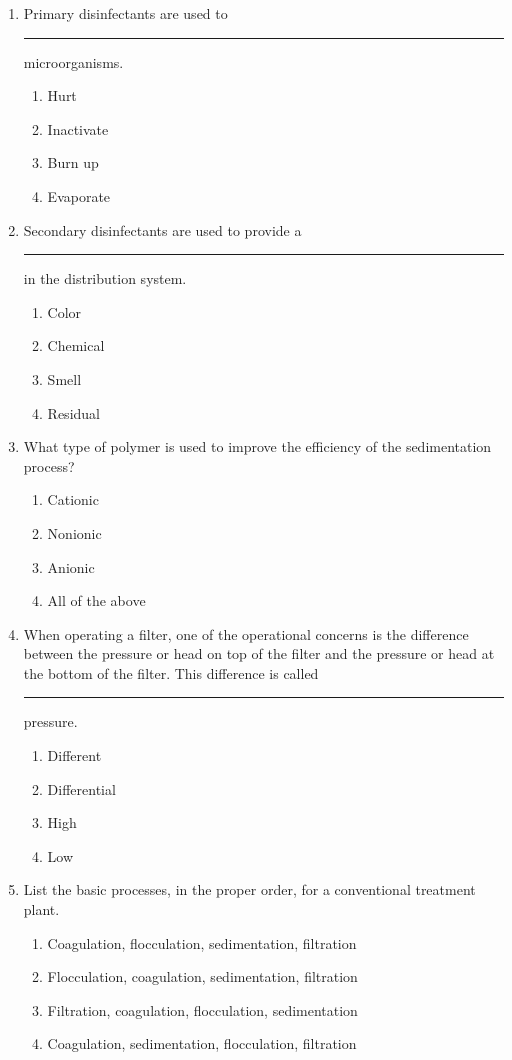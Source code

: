 \begin{enumerate}
\item Primary disinfectants are used to \rule{1cm}{0.5pt}  microorganisms.
\begin{enumerate}
\item Hurt
\item Inactivate
\item Burn up
\item Evaporate
\end{enumerate}

\item Secondary disinfectants are used to provide a \rule{1cm}{0.5pt}  in the distribution system.
\begin{enumerate}
\item Color
\item Chemical
\item Smell
\item Residual
\end{enumerate}

\item What type of polymer is used to improve the efficiency of the sedimentation
process?
\begin{enumerate}
\item Cationic
\item Nonionic
\item Anionic
\item All of the above
\end{enumerate}

\item When operating a filter, one of the operational concerns is the difference between the pressure or head on top of the filter and the pressure or head at the bottom of the filter. This difference is called \rule{1cm}{0.5pt}  pressure.
\begin{enumerate}
\item Different
\item Differential
\item High
\item Low
\end{enumerate}

\item List the basic processes, in the proper order, for a conventional treatment plant.
\begin{enumerate}
\item Coagulation, flocculation, sedimentation, filtration
\item Flocculation, coagulation, sedimentation, filtration
\item Filtration, coagulation, flocculation, sedimentation
\item Coagulation, sedimentation, flocculation, filtration
\end{enumerate}


\end{enumerate}
